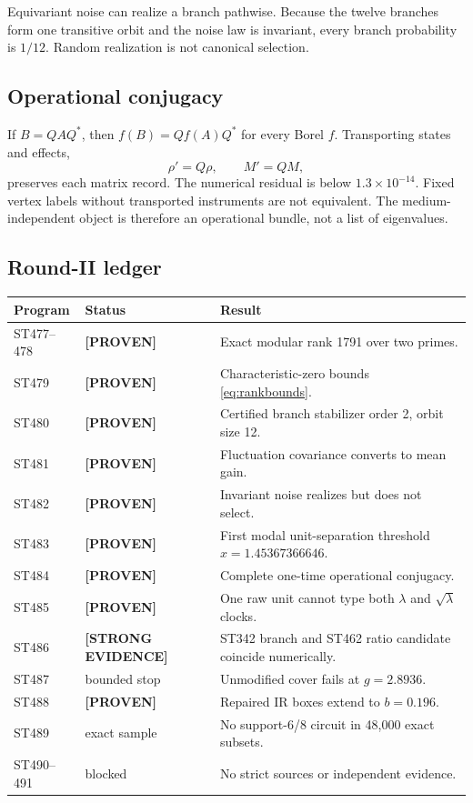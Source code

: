 \documentclass[11pt,a4paper]{article}
\theoremstyle{definition}\newtheorem{definition}[theorem]{Definition}
\theoremstyle{remark}\newtheorem{remark}[theorem]{Remark}
\newcommand{\status}[2]{\textcolor{#1}{\textbf{[#2]}}}
\newcommand{\proven}{\status{fingreen}{PROVEN}}\newcommand{\strong}{\status{finblue}{STRONG EVIDENCE}}
\begin{document}
Equivariant noise can realize a branch pathwise. Because the twelve branches form one transitive orbit and the noise law is invariant, every branch probability is $1/12$. Random realization is not canonical selection.

\subsection{Operational conjugacy}

If $B=QAQ^*$, then $f(B)=Qf(A)Q^*$ for every Borel $f$. Transporting states and effects,
\[
\rho'=Q\rho,\qquad M'=QM,
\]
preserves each matrix record. The numerical residual is below $1.3\times10^{-14}$. Fixed vertex labels without transported instruments are not equivalent. The medium-independent object is therefore an operational bundle, not a list of eigenvalues.

\subsection{Round-II ledger}
\begin{longtable}{@{}p{}p{}p{}@{}}\toprule Program&Status&Result\\\midrule\endhead
ST477--478&\proven&Exact modular rank 1791 over two primes.\\
ST479&\proven&Characteristic-zero bounds \eqref{eq:rankbounds}.\\
ST480&\proven&Certified branch stabilizer order 2, orbit size 12.\\
ST481&\proven&Fluctuation covariance converts to mean gain.\\
ST482&\proven&Invariant noise realizes but does not select.\\
ST483&\proven&First modal unit-separation threshold $x=1.45367366646$.\\
ST484&\proven&Complete one-time operational conjugacy.\\
ST485&\proven&One raw unit cannot type both $\lambda$ and $\sqrt\lambda$ clocks.\\
ST486&\strong&ST342 branch and ST462 ratio candidate coincide numerically.\\
ST487&bounded stop&Unmodified cover fails at $g=2.8936$.\\
ST488&\proven&Repaired IR boxes extend to $b=0.196$.\\
ST489&exact sample&No support-6/8 circuit in 48,000 exact subsets.\\
ST490--491&blocked&No strict sources or independent evidence.\\\bottomrule\end{longtable}
\end{document}
